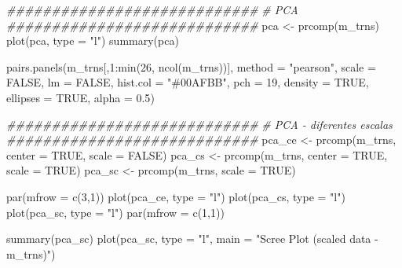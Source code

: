 \documentclass[
  letterpaper,
  DIV=11,
  numbers=noendperiod]{scrartcl}
\newenvironment{Shaded}{}{}
\newcommand{\AttributeTok}[1]{\textcolor[rgb]{0.49,0.56,0.16}{#1}}
\newcommand{\CommentTok}[1]{\textcolor[rgb]{0.38,0.63,0.69}{\textit{#1}}}
\newcommand{\ConstantTok}[1]{\textcolor[rgb]{0.53,0.00,0.00}{#1}}
\newcommand{\DecValTok}[1]{\textcolor[rgb]{0.25,0.63,0.44}{#1}}
\newcommand{\DocumentationTok}[1]{\textcolor[rgb]{0.73,0.13,0.13}{\textit{#1}}}
\newcommand{\FloatTok}[1]{\textcolor[rgb]{0.25,0.63,0.44}{#1}}
\newcommand{\FunctionTok}[1]{\textcolor[rgb]{0.02,0.16,0.49}{#1}}
\newcommand{\NormalTok}[1]{#1}
\newcommand{\OtherTok}[1]{\textcolor[rgb]{0.00,0.44,0.13}{#1}}
\newcommand{\SpecialCharTok}[1]{\textcolor[rgb]{0.25,0.44,0.63}{#1}}
\newcommand{\StringTok}[1]{\textcolor[rgb]{0.25,0.44,0.63}{#1}}
\begin{document}
\begin{Shaded}
\begin{Highlighting}[numbers=left,,]
\DocumentationTok{\#\#\#\#\#\#\#\#\#\#\#\#\#\#\#\#\#\#\#\#\#\#\#\#\#\#\#\#}
\CommentTok{\# PCA}
\DocumentationTok{\#\#\#\#\#\#\#\#\#\#\#\#\#\#\#\#\#\#\#\#\#\#\#\#\#\#\#\#}
\NormalTok{pca }\OtherTok{\textless{}{-}} \FunctionTok{prcomp}\NormalTok{(m\_trns)}
\FunctionTok{plot}\NormalTok{(pca, }\AttributeTok{type =} \StringTok{"l"}\NormalTok{)}
\FunctionTok{summary}\NormalTok{(pca)}

\FunctionTok{pairs.panels}\NormalTok{(m\_trns[,}\DecValTok{1}\SpecialCharTok{:}\FunctionTok{min}\NormalTok{(}\DecValTok{26}\NormalTok{, }\FunctionTok{ncol}\NormalTok{(m\_trns))], }
             \AttributeTok{method =} \StringTok{"pearson"}\NormalTok{,}
             \AttributeTok{scale =} \ConstantTok{FALSE}\NormalTok{, }\AttributeTok{lm =} \ConstantTok{FALSE}\NormalTok{,}
             \AttributeTok{hist.col =} \StringTok{"\#00AFBB"}\NormalTok{, }\AttributeTok{pch =} \DecValTok{19}\NormalTok{,}
             \AttributeTok{density =} \ConstantTok{TRUE}\NormalTok{, }\AttributeTok{ellipses =} \ConstantTok{TRUE}\NormalTok{, }\AttributeTok{alpha =} \FloatTok{0.5}\NormalTok{)}

\DocumentationTok{\#\#\#\#\#\#\#\#\#\#\#\#\#\#\#\#\#\#\#\#\#\#\#\#\#\#\#\#}
\CommentTok{\# PCA {-} diferentes escalas}
\DocumentationTok{\#\#\#\#\#\#\#\#\#\#\#\#\#\#\#\#\#\#\#\#\#\#\#\#\#\#\#\#}
\NormalTok{pca\_ce }\OtherTok{\textless{}{-}} \FunctionTok{prcomp}\NormalTok{(m\_trns, }\AttributeTok{center =} \ConstantTok{TRUE}\NormalTok{, }\AttributeTok{scale =} \ConstantTok{FALSE}\NormalTok{)}
\NormalTok{pca\_cs }\OtherTok{\textless{}{-}} \FunctionTok{prcomp}\NormalTok{(m\_trns, }\AttributeTok{center =} \ConstantTok{TRUE}\NormalTok{, }\AttributeTok{scale =} \ConstantTok{TRUE}\NormalTok{)}
\NormalTok{pca\_sc }\OtherTok{\textless{}{-}} \FunctionTok{prcomp}\NormalTok{(m\_trns, }\AttributeTok{scale =} \ConstantTok{TRUE}\NormalTok{)}

\FunctionTok{par}\NormalTok{(}\AttributeTok{mfrow =} \FunctionTok{c}\NormalTok{(}\DecValTok{3}\NormalTok{,}\DecValTok{1}\NormalTok{))}
\FunctionTok{plot}\NormalTok{(pca\_ce, }\AttributeTok{type =} \StringTok{"l"}\NormalTok{)}
\FunctionTok{plot}\NormalTok{(pca\_cs, }\AttributeTok{type =} \StringTok{"l"}\NormalTok{)}
\FunctionTok{plot}\NormalTok{(pca\_sc, }\AttributeTok{type =} \StringTok{"l"}\NormalTok{)}
\FunctionTok{par}\NormalTok{(}\AttributeTok{mfrow =} \FunctionTok{c}\NormalTok{(}\DecValTok{1}\NormalTok{,}\DecValTok{1}\NormalTok{))}

\FunctionTok{summary}\NormalTok{(pca\_sc)}
\FunctionTok{plot}\NormalTok{(pca\_sc, }\AttributeTok{type =} \StringTok{"l"}\NormalTok{, }\AttributeTok{main =} \StringTok{"Scree Plot (scaled data {-} m\_trns)"}\NormalTok{)}


\end{Highlighting}
\end{Shaded}
\end{document}
